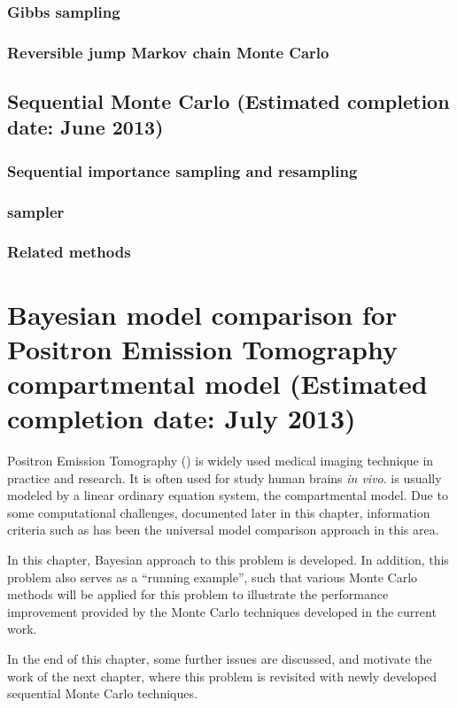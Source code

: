 \documentclass[11pt, fontset = Minion]{marticle}
\def\finish#1{(Estimated completion date: #1 2013)}
\begin{document}
\subsubsection{Gibbs sampling}

\subsubsection{Reversible jump Markov chain Monte Carlo}

\subsection{Sequential Monte Carlo \finish{June}}

\subsubsection{Sequential importance sampling and resampling}

\subsubsection{\smc sampler}

\subsubsection{Related methods}

\section{Bayesian model comparison for Positron Emission Tomography
  compartmental model \finish{July}}

Positron Emission Tomography (\pet) is widely used medical imaging technique
in practice and research. It is often used for study human brains \emph{in
  vivo}. \pet is usually modeled by a linear ordinary equation system, the
compartmental model. Due to some computational challenges, documented later in
this chapter, information criteria such as \aic has been the universal model
comparison approach in this area.

In this chapter, Bayesian approach to this problem is developed. In addition,
this problem also serves as a ``running example'', such that various Monte
Carlo methods will be applied for this problem to illustrate the performance
improvement provided by the Monte Carlo techniques developed in the current
work.

In the end of this chapter, some further issues are discussed, and motivate
the work of the next chapter, where this problem is revisited with newly
developed sequential Monte Carlo techniques.
\end{document}
